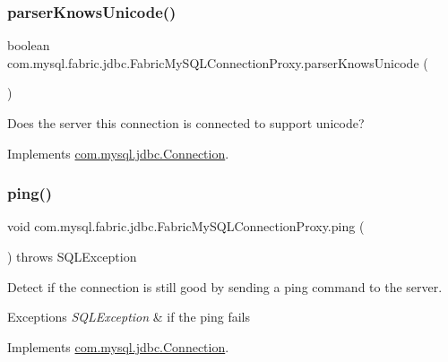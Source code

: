 \subsubsection{\texorpdfstring{parser\+Knows\+Unicode()}{parserKnowsUnicode()}}
{\footnotesize\ttfamily boolean com.\+mysql.\+fabric.\+jdbc.\+Fabric\+My\+S\+Q\+L\+Connection\+Proxy.\+parser\+Knows\+Unicode (\begin{DoxyParamCaption}{ }\end{DoxyParamCaption})}

Does the server this connection is connected to support unicode? 

Implements \mbox{\hyperlink{interfacecom_1_1mysql_1_1jdbc_1_1_connection_a09e06dca89e57de8d11e9e9ff2d78f4d}{com.\+mysql.\+jdbc.\+Connection}}.

\mbox{\label{classcom_1_1mysql_1_1fabric_1_1jdbc_1_1_fabric_my_s_q_l_connection_proxy_a79f343dc72188e66961f0cf251ad5443}} 
\subsubsection{\texorpdfstring{ping()}{ping()}}
{\footnotesize\ttfamily void com.\+mysql.\+fabric.\+jdbc.\+Fabric\+My\+S\+Q\+L\+Connection\+Proxy.\+ping (\begin{DoxyParamCaption}{ }\end{DoxyParamCaption}) throws S\+Q\+L\+Exception}

Detect if the connection is still good by sending a ping command to the server.


\begin{DoxyExceptions}{Exceptions}
{\em S\+Q\+L\+Exception} & if the ping fails \\
\hline
\end{DoxyExceptions}


Implements \mbox{\hyperlink{interfacecom_1_1mysql_1_1jdbc_1_1_connection_a65a9bf75714ed318b0324f99dfa09761}{com.\+mysql.\+jdbc.\+Connection}}.

\mbox{\label{classcom_1_1mysql_1_1fabric_1_1jdbc_1_1_fabric_my_s_q_l_connection_proxy_a651b3a0b54a792d21b9068f33395971c}} 
